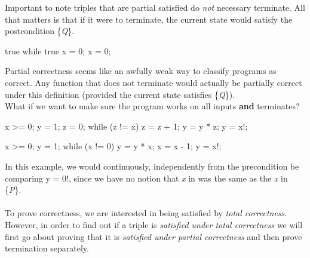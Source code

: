 Important to note triples that are partial satisfied do \emph{not} necessary terminate.  All that matters is that if it were to terminate, the current state would satisfy the postcondition \{\emph{Q}\}.\\

\begin{code}[C]
{true}
while true {x = 0;}
{x = 0;}
\end{code}

Partial correctness seems like an awfully weak way to classify programs as correct.  Any function that does not terminate would actually be partially correct under this definition (provided the current state satisfies \{\emph{Q}\}).\\

What if we want to make sure the program works on all inputs \textbf{and} terminates?\\


\begin{code}[C]
{x >= 0;}
y = 1;
z = 0;
while (z != x) {
		z = z + 1;
		y = y * z;
}
{y = x!;}
\end{code}

\begin{code}[C]
{x >= 0;}
y = 1;
while (x != 0) {
		y = y * x;
		x = x - 1;
}
{y = x!;}
\end{code}
In this example, we would continuously, independently from the precondition be comparing y = 0!, since we have no notion that \emph{x} in  was the same as the \emph{x} in \{\emph{P}\}.\\
\\ 
To prove correctness, we are interested in being satisfied by \emph{total correctness}.  However, in order to find out if a triple is \emph{satisfied under total correctness} we will first go about proving that it is \emph{satisfied under partial correctness} and then prove termination separately.\\


